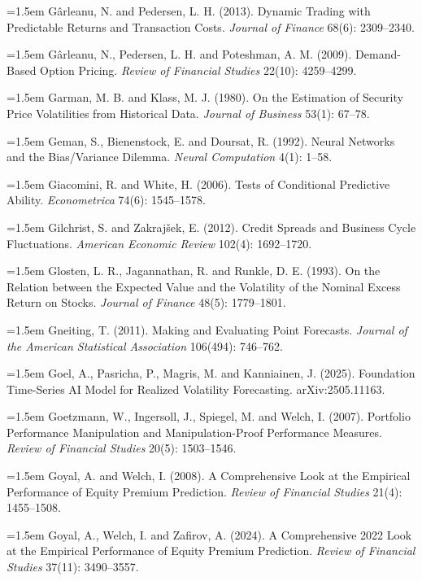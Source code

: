 \hangindent=1.5em G\^arleanu, N. and Pedersen, L. H. (2013). Dynamic Trading with Predictable Returns and Transaction Costs. \emph{Journal of Finance} 68(6): 2309--2340.

\hangindent=1.5em G\^arleanu, N., Pedersen, L. H. and Poteshman, A. M. (2009). Demand-Based Option Pricing. \emph{Review of Financial Studies} 22(10): 4259--4299.

\hangindent=1.5em Garman, M. B. and Klass, M. J. (1980). On the Estimation of Security Price Volatilities from Historical Data. \emph{Journal of Business} 53(1): 67--78.

\hangindent=1.5em Geman, S., Bienenstock, E. and Doursat, R. (1992). Neural Networks and the Bias/Variance Dilemma. \emph{Neural Computation} 4(1): 1--58.

\hangindent=1.5em Giacomini, R. and White, H. (2006). Tests of Conditional Predictive Ability. \emph{Econometrica} 74(6): 1545--1578.

\hangindent=1.5em Gilchrist, S. and Zakraj\v{s}ek, E. (2012). Credit Spreads and Business Cycle Fluctuations. \emph{American Economic Review} 102(4): 1692--1720.

\hangindent=1.5em Glosten, L. R., Jagannathan, R. and Runkle, D. E. (1993). On the Relation between the Expected Value and the Volatility of the Nominal Excess Return on Stocks. \emph{Journal of Finance} 48(5): 1779--1801.

\hangindent=1.5em Gneiting, T. (2011). Making and Evaluating Point Forecasts. \emph{Journal of the American Statistical Association} 106(494): 746--762.

\hangindent=1.5em Goel, A., Pasricha, P., Magris, M. and Kanniainen, J. (2025). Foundation Time-Series AI Model for Realized Volatility Forecasting. arXiv:2505.11163.

\hangindent=1.5em Goetzmann, W., Ingersoll, J., Spiegel, M. and Welch, I. (2007). Portfolio Performance Manipulation and Manipulation-Proof Performance Measures. \emph{Review of Financial Studies} 20(5): 1503--1546.

\hangindent=1.5em Goyal, A. and Welch, I. (2008). A Comprehensive Look at the Empirical Performance of Equity Premium Prediction. \emph{Review of Financial Studies} 21(4): 1455--1508.

\hangindent=1.5em Goyal, A., Welch, I. and Zafirov, A. (2024). A Comprehensive 2022 Look at the Empirical Performance of Equity Premium Prediction. \emph{Review of Financial Studies} 37(11): 3490--3557.


